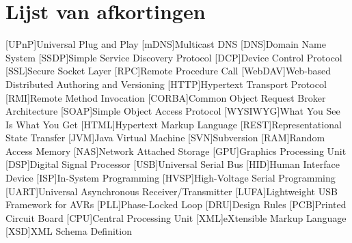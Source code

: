 %
%

\listoffigures


%
%

\chapter*{Lijst van afkortingen}

\begin{acronym}[WYSIWYG]	%

[UPnP]{Universal Plug and Play}
[mDNS]{Multicast DNS}
[DNS]{Domain Name System}
[SSDP]{Simple Service Discovery Protocol}
[DCP]{Device Control Protocol}
[SSL]{Secure Socket Layer}
[RPC]{Remote Procedure Call}
[WebDAV]{Web-based Distributed Authoring and Versioning}
[HTTP]{Hypertext Transport Protocol}
[RMI]{Remote Method Invocation}
[CORBA]{Common Object Request Broker Architecture}
[SOAP]{Simple Object Access Protocol}
[WYSIWYG]{What You See Is What You Get}
[HTML]{Hypertext Markup Language}
[REST]{Representational State Transfer}
[JVM]{Java Virtual Machine}
[SVN]{Subversion}
[RAM]{Random Access Memory}
[NAS]{Network Attached Storage}
[GPU]{Graphics Processing Unit}
[DSP]{Digital Signal Processor}
[USB]{Universal Serial Bus}
[HID]{Human Interface Device}
[ISP]{In-System Programming}
[HVSP]{High-Voltage Serial Programming}
[UART]{Universal Asynchronous Receiver/Transmitter}
[LUFA]{Lightweight USB Framework for AVRs}
[PLL]{Phase-Locked Loop}
[DRU]{Design Rules}
[PCB]{Printed Circuit Board}
[CPU]{Central Processing Unit}
[XML]{eXtensible Markup Language}
[XSD]{XML Schema Definition}

\end{acronym}
